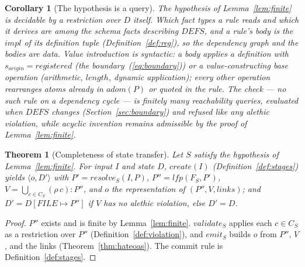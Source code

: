 \documentclass[10pt,twocolumn]{article}
\theoremstyle{plain}
\newtheorem{theorem}{Theorem}
\newtheorem{corollary}{Corollary}
\theoremstyle{definition}
\begin{document}
\begin{corollary}[The hypothesis is a query]\label{cor:finitecheck}
The hypothesis of Lemma~\ref{lem:finite} is decidable by a restriction over $D$ itself. Which fact types a rule reads and which it derives are among the schema facts describing $\mathit{DEFS}$, and a rule's body is the $\mathit{impl}$ of its definition tuple (Definition~\ref{def:reg}), so the dependency graph and the bodies are data. Value introduction is syntactic: a body applies a definition with $s_{\mathit{origin}}=\mathit{registered}$ (the boundary~(\ref{eq:boundary})) or a value-constructing base operation (arithmetic, $\mathit{length}$, dynamic application); every other operation rearranges atoms already in $\mathit{adom}(P)$ or quoted in the rule. The check --- no such rule on a dependency cycle --- is finitely many reachability queries, evaluated when $\mathit{DEFS}$ changes (Section~\ref{sec:boundary}) and refused like any alethic violation, while acyclic invention remains admissible by the proof of Lemma~\ref{lem:finite}.
\end{corollary}

\begin{theorem}[Completeness of state transfer]\label{thm:complete}
Let $S$ satisfy the hypothesis of Lemma~\ref{lem:finite}. For input $I$ and state $D$, $\mathit{create}(I)$ (Definition~\ref{def:stages}) yields $\langle o,D'\rangle$ with $P'=\mathit{resolve}_S(I,P)$, $P''=\mathit{lfp}(F_S,P')$, $V=\bigcup_{c\in C_S}(\rho\,c)\!:\!P''$, and $o$ the representation of $(P'',V,\mathit{links})$; and $D'=D[\mathit{FILE}\mapsto P'']$ if $V$ has no alethic violation, else $D'=D$.
\end{theorem}
\begin{proof}
$P''$ exists and is finite by Lemma~\ref{lem:finite}. $\mathit{validate}_S$ applies each $c\in C_S$ as a restriction over $P''$ (Definition~\ref{def:violation}), and $\mathit{emit}_S$ builds $o$ from $P''$, $V$, and the links (Theorem~\ref{thm:hateoas}). The commit rule is Definition~\ref{def:stages}.
\end{proof}
\end{document}
